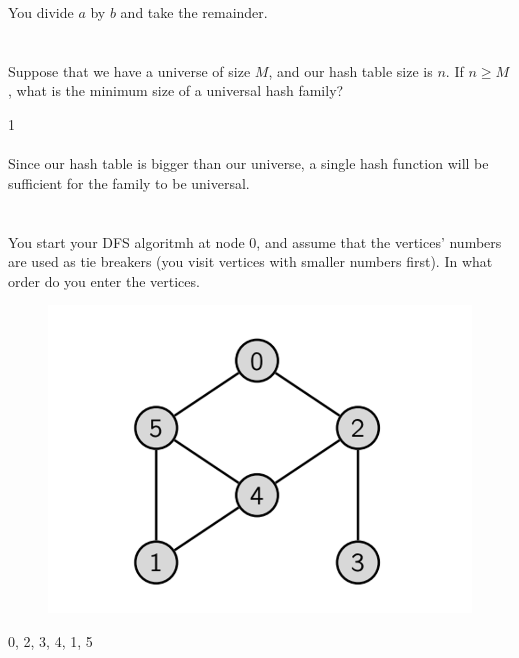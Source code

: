 \documentclass [12pt]{article}
\begin{document}
\begin{Solution}
You divide $a$ by $b$ and take the remainder.
\end{Solution}


\section{} Suppose that we have a universe of size $M$, and our hash table size is $n$. If $n \geq M$, what is the minimum size of a universal hash family?

\begin{Solution}
1
\paragraph{}
Since our hash table is bigger than our universe, a single hash function will be sufficient for the family to be universal.
\end{Solution}


\section{} You start your DFS algoritmh at node $0$, and assume that the vertices' numbers are used as tie breakers (you visit vertices with smaller numbers first). In what order do you enter the vertices.
\begin{figure}[H]
    \centering
    \includegraphics[scale=0.5]{1.png} 
    \label{fig:my_label}
\end{figure}

\begin{Solution}
0, 2, 3, 4, 1, 5
\end{Solution}
\end{document}
